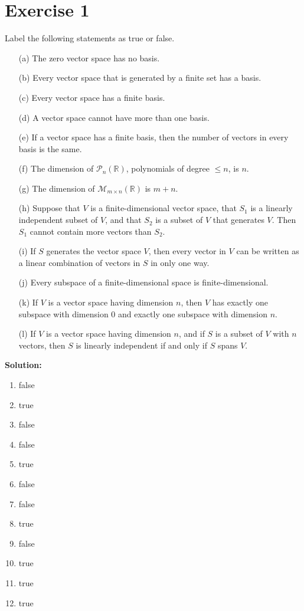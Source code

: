 \documentclass{article}
\begin{document}
\section*{Exercise 1}
Label the following statements as true or false.
\begin{itemize}
\item[(a)] The zero vector space has no basis.
\item[(b)] Every vector space that is generated by a finite set has a basis.
\item[(c)] Every vector space has a finite basis.
\item[(d)] A vector space cannot have more than one basis.
\item[(e)] If a vector space has a finite basis, then the number of vectors in every basis is the same.
\item[(f)] The dimension of $\mathcal{P}_n(\mathbb{R})$, polynomials of degree $\leq n$, is $n$.
\item[(g)] The dimension of $\mathcal{M}_{m\times n}(\mathbb{R})$ is $m + n$.
\item[(h)] Suppose that $V$ is a finite-dimensional vector space, that $S_1$ is a linearly independent subset of $V$, and that $S_2$ is a subset of $V$ that generates $V$. Then $S_1$ cannot contain more vectors than $S_2$.
\item[(i)] If $S$ generates the vector space $V$, then every vector in $V$ can be written as a linear combination of vectors in $S$ in only one way.
\item[(j)] Every subspace of a finite-dimensional space is finite-dimensional.
\item[(k)] If $V$ is a vector space having dimension $n$, then $V$ has exactly one subspace with dimension 0 and exactly one subspace with dimension $n$.
\item[(l)] If $V$ is a vector space having dimension $n$, and if $S$ is a subset of $V$ with $n$ vectors, then $S$ is linearly independent if and only if $S$ spans $V$.
\end{itemize}

\textbf{Solution:}
\begin{enumerate}[label=(\alph*)]
\item false
\item true
\item false
\item false
\item true
\item false
\item false
\item true
\item false
\item true
\item true
\item true
\end{enumerate}
\end{document}
